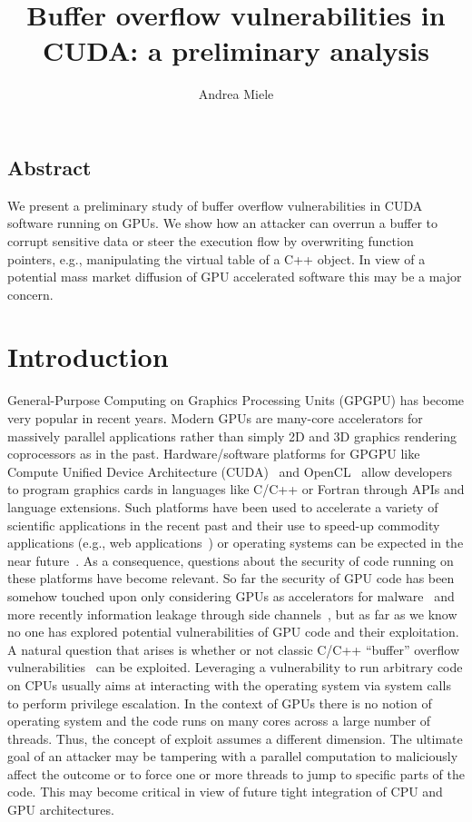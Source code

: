 \documentclass[11pt]{llncs}
\begin{document}
\lstset{language=C++}
\title{Buffer overflow vulnerabilities in CUDA: a preliminary analysis}

\author{Andrea Miele}

\maketitle


\subsection*{Abstract}
We present a preliminary study of buffer overflow vulnerabilities in CUDA software running on GPUs.
We show how an attacker can overrun a buffer to corrupt sensitive data or steer the execution flow by overwriting function pointers, e.g., manipulating the virtual table of a C++ object.
In view of a potential mass market diffusion of GPU accelerated software this may be a major concern.
\section{Introduction}
General-Purpose Computing on Graphics Processing Units (GPGPU) has become very popular in recent years.
Modern GPUs are many-core accelerators for massively parallel applications rather than simply 2D and 3D graphics rendering coprocessors as in the past.
Hardware/software platforms for GPGPU like Compute Unified Device Architecture (CUDA)~\cite{CUDAProgramming2014} and OpenCL~\cite{opencl,OpenCLAMD} allow developers to program graphics cards in languages like C/C++ or Fortran through APIs and language extensions.
Such platforms have been used to accelerate a variety of scientific applications in the recent past and their use to speed-up commodity applications (e.g., web applications~\cite{webgl}) or operating systems can be expected in the near future~\cite{gpufs}.
As a consequence, questions about the security of code running on these platforms have become relevant.
So far the security of GPU code has been somehow touched upon only considering GPUs as accelerators for malware~\cite{5665801,Ruxcon} and more recently information leakage through side channels~\cite{cudaleaks}, but as far as we know no one has explored potential vulnerabilities of GPU code and their exploitation.
A natural question that arises is whether or not classic C/C++ ``buffer'' overflow vulnerabilities~\cite{bof,hof,vtabo} can be exploited. 
Leveraging a vulnerability to run arbitrary code on CPUs usually aims at interacting with the operating system via system calls to perform privilege escalation.
In the context of GPUs there is no notion of operating system and the code runs on many cores across a large number of threads.
Thus, the concept of exploit assumes a different dimension.
The ultimate goal of an attacker may be tampering with a parallel computation to maliciously affect the outcome or to force one or more threads to jump to specific parts of the code.
This may become critical in view of future tight integration of CPU and GPU architectures.
\end{document}
